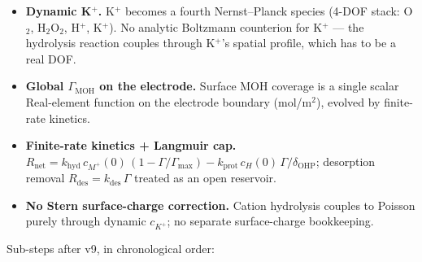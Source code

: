 \documentclass[11pt]{article}
\begin{document}
\begin{itemize}\setlength{\itemsep}{1pt}
\item \textbf{Dynamic K$^+$.}  K$^+$ becomes a fourth Nernst--Planck
  species (4-DOF stack: O$_2$, H$_2$O$_2$, H$^+$, K$^+$).  No analytic
  Boltzmann counterion for K$^+$ --- the hydrolysis reaction couples
  through K$^+$'s spatial profile, which has to be a real DOF.
\item \textbf{Global $\Gamma_{\mathrm{MOH}}$ on the electrode.}  Surface
  MOH coverage is a single scalar Real-element function on the
  electrode boundary (mol/m$^2$), evolved by finite-rate kinetics.
\item \textbf{Finite-rate kinetics + Langmuir cap.}
  $R_{\mathrm{net}} = k_{\mathrm{hyd}}\,c_{M^+}(0)\,(1 - \Gamma/\Gamma_{\mathrm{max}})
   - k_{\mathrm{prot}}\,c_H(0)\,\Gamma/\delta_{\mathrm{OHP}}$;
  desorption removal $R_{\mathrm{des}} = k_{\mathrm{des}}\,\Gamma$
  treated as an open reservoir.
\item \textbf{No Stern surface-charge correction.}  Cation hydrolysis
  couples to Poisson purely through dynamic $c_{K^+}$; no separate
  surface-charge bookkeeping.
\end{itemize}

Sub-steps after v9, in chronological order:
\end{document}

